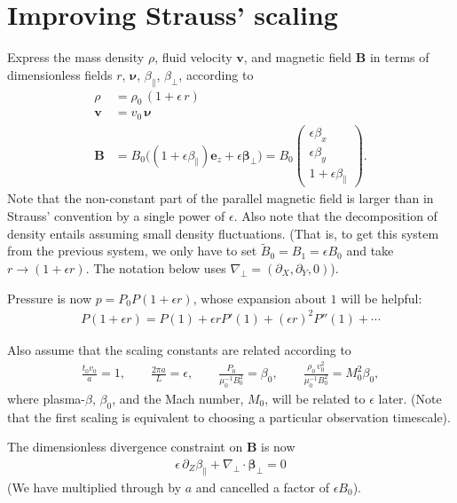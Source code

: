 \documentclass{article}
\newcommand{\para}{\parallel}
\newcommand{\ep}{\epsilon}
\newcommand{\np}{\nabla_\perp}
\newcommand{\p}{\partial}
\newcommand{\til}[1]{\widetilde{ #1 }}
\newcommand{\pmat} [1] {\begin{pmatrix} #1 \end{pmatrix}}
\begin{document}
\section{Improving Strauss' scaling}
Express the mass density $\rho$, fluid velocity $\bm{v}$, and magnetic field $\bm{B}$ in terms of dimensionless fields $r$, $\bm{\nu}$, $\beta_\parallel$, $\beta_\perp$, according to
\begin{align*}
    \rho &= \rho_0\,(1 + \epsilon\,r)\\
    \bm{v} & = v_0\,\bm{\nu}\\
    \bm{B} & = B_0\bigg((1 + \ep\beta_\para)\bm{e}_z + \ep\bm{\beta}_\perp\bigg) = B_0 \pmat{\ep\beta_x \\ \ep\beta_y \\ 1+\ep\beta_\para} .
\end{align*}
Note that the non-constant part of the parallel magnetic field is larger than in Strauss' convention by a single power of $\epsilon$. Also note that the decomposition of density entails assuming small density fluctuations. (That is, to get this system from the previous system, we only have to set $\til{B}_0 = B_1 = \ep B_0$ and take $r\rightarrow (1+\ep r)$. The notation below uses $\np = (\p_X, \p_Y, 0)$). 

Pressure is now $p=P_0P(1+\ep r)$, whose expansion about $1$ will be helpful: 
\begin{align*}
    P(1+\ep r) = P(1) + \ep rP'(1) + (\ep r)^2 P''(1) + \cdots 
\end{align*}

Also assume that the scaling constants are related according to
\begin{align*}
    \frac{t_0 v_0}{a} = 1, \qquad 
    \frac{2\pi a}{L} = \ep, \qquad 
    \frac{P_0}{\mu_0^{-1}B_0^2} = \beta_0, \qquad 
    \frac{\rho_0\,v_0^2}{\mu_0^{-1}B_0^2} = M_0^2\beta_0, 
\end{align*}
where plasma-$\beta$, $\beta_0$, and the Mach number, $M_0$, will be related to $\epsilon$ later. (Note that the first scaling is equivalent to choosing a particular observation timescale). 

The dimensionless divergence constraint on $\bm{B}$ is now
\begin{align}
\epsilon\,\partial_Z\beta_\parallel + \np\cdot\bm{\beta}_\perp = 0 
\end{align}
(We have multiplied through by $a$ and cancelled a factor of $\ep B_0$). 
\end{document}
